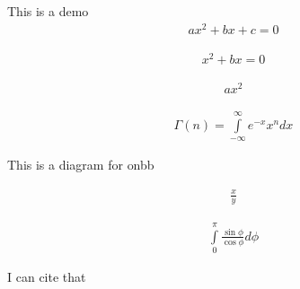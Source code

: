 \documentclass[a4paper]{article}
\author{Prakash Gautam}
\begin{document}
    This is a demo
    \begin{align}
        ax ^2 + bx +c = 0
    \end{align}

    \begin{align*}
        x^{2} + bx = 0
    \end{align*}

    \begin{align*}
        ax^{2}
    \end{align*}
    
    \begin{align*}
        \Gamma(n) = \int\limits_{-\infty}^{\infty} e^{-x} x^{n}dx
    \end{align*}

    \begin{figure}[h!]
        \centering
        
        \caption{}
        \label{fig:}
    \end{figure}
    
    This is a diagram for \gls{onbb}

    \begin{align*}
        \frac{x}{y}
    \end{align*}

    \begin{align*}
        \int\limits_{0}^{\pi} \frac{\sin{\phi}}{\cos{\phi}} d\phi
    \end{align*}

I can cite that \cite{prelovsekHeavyFlavorsLattice2017}
    \begin{figure}[h!]
        \centering
        
        \label{fig:}
    \end{figure}
     
    
    
    
    


    
\end{document}

